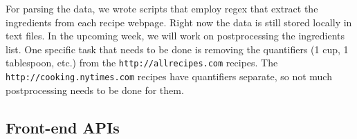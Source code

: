 \documentclass{article}
\begin{document}
For parsing the data, we wrote scripts that employ regex that extract the ingredients from each recipe webpage. Right now the data is still stored locally in text files. In the upcoming week, we will work on postprocessing the ingredients list. One specific task that needs to be done is removing the quantifiers (1 cup, 1 tablespoon, etc.) from the \texttt{http://allrecipes.com} recipes. The \texttt{http://cooking.nytimes.com} recipes have quantifiers separate, so not much postprocessing needs to be done for them.


\subsection{Front-end APIs}
\end{document}
